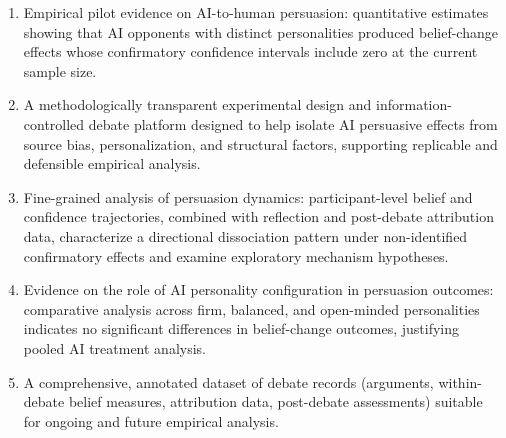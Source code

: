 \begin{enumerate}
    \item Empirical pilot evidence on AI-to-human persuasion: quantitative estimates showing that AI opponents
    with distinct personalities produced belief-change effects whose confirmatory confidence
    intervals include zero at the current sample size.

    \item A methodologically transparent experimental design and information-controlled debate platform
    designed to help isolate AI persuasive effects from source bias, personalization, and structural
    factors, supporting replicable and defensible empirical analysis.

    \item Fine-grained analysis of persuasion dynamics: participant-level belief and confidence trajectories,
    combined with reflection and post-debate attribution data, characterize a directional dissociation pattern
    under non-identified confirmatory effects and examine exploratory mechanism hypotheses.

    \item Evidence on the role of AI personality configuration in persuasion outcomes:
    comparative analysis across firm, balanced, and open-minded personalities indicates no significant
    differences in belief-change outcomes, justifying pooled AI treatment analysis.

    \item A comprehensive, annotated dataset of debate records (arguments, within-debate belief measures,
    attribution data, post-debate assessments) suitable for ongoing and future empirical analysis.
\end{enumerate}
